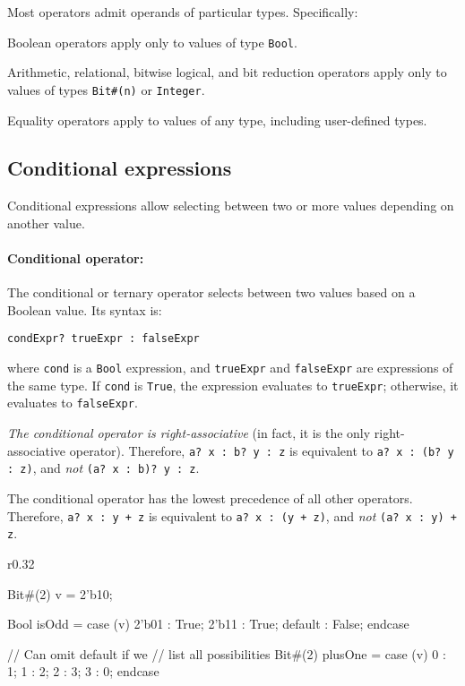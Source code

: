 \smallskip

Most operators admit operands of particular types. Specifically:
\begin{compactitem}
\item Boolean operators apply only to values of type \texttt{Bool}.
\item Arithmetic, relational, bitwise logical, and bit reduction operators
  apply only to values of types \texttt{Bit\#(n)} or \texttt{Integer}.
\item Equality operators apply to values of any type, including user-defined types.
\end{compactitem}

\subsection{Conditional expressions}
\label{sec:condExprs}

Conditional expressions allow selecting between two or more values depending on another value.

\paragraph{Conditional operator:} The conditional or ternary operator selects between two values based on a Boolean value.
Its syntax is: 
\begin{center}
\verb|condExpr? trueExpr : falseExpr|
\end{center}
where \verb|cond| is a \verb|Bool| expression, and \verb|trueExpr| and \verb|falseExpr| are expressions of the same type.
If \verb|cond| is \verb|True|, the expression evaluates to \verb|trueExpr|; otherwise, it evaluates to \verb|falseExpr|.

\emph{The conditional operator is right-associative} (in fact, it is the only right-associative operator).
Therefore, \verb|a? x : b? y : z| is equivalent to
\verb|a? x : (b? y : z)|, and \emph{not} \verb|(a? x : b)? y : z|.

The conditional operator has the lowest precedence of all other operators.
Therefore, \verb|a? x : y + z| is equivalent to \verb|a? x : (y + z)|,
and \emph{not} \verb|(a? x : y) + z|.

\begin{wrapfigure}{r}{0.32\columnwidth}
\vspace{-2em}
\begin{mscode}
Bit#(2) v = 2'b10;

Bool isOdd = case (v)
  2'b01 : True;
  2'b11 : True;
  default : False;
endcase

// Can omit default if we
// list all possibilities
Bit#(2) plusOne = case (v)
  0 : 1;
  1 : 2;
  2 : 3;
  3 : 0;
endcase
\end{mscode}
\vspace{-2em}
\end{wrapfigure}

